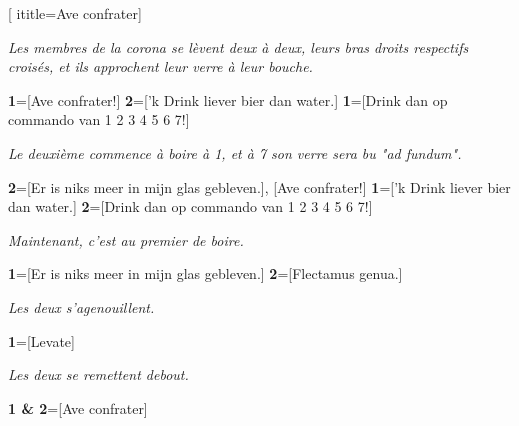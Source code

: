 [
ititle={Ave confrater}]


\emph{Les membres de la corona se lèvent deux à deux, leurs bras droits respectifs croisés, et ils approchent
	leur verre à leur bouche.}

\beginverse
\textbf{1}=[Ave confrater!]
\textbf{2}=['k Drink liever bier dan water.]
\textbf{1}=[Drink dan op commando van 1 2 3 4 5 6 7!]
\endverse

\emph{Le deuxième commence à boire à \textit{1}, et à \textit{7} son verre sera bu "ad fundum".}

\beginverse
\textbf{2}=[Er is niks meer in mijn glas gebleven.],
[Ave confrater!]
\textbf{1}=['k Drink liever bier dan water.]
\textbf{2}=[Drink dan op commando van 1 2 3 4 5 6 7!]
\endverse

\emph{Maintenant, c'est au premier de boire.}

\beginverse
\textbf{1}=[Er is niks meer in mijn glas gebleven.]
\textbf{2}=[Flectamus genua.]
\endverse

\emph{Les deux s'agenouillent.}

\beginverse
\textbf{1}=[Levate]
\endverse

\emph{Les deux se remettent debout.}

\beginverse
\textbf{1 & 2}=[Ave confrater]
\endverse
\endsong
